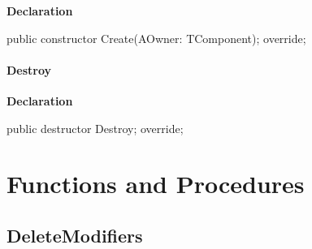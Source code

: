 \documentclass{report}
\newif\ifpdf
\begin{document}
\label{common.TListEntry-Create}
\begin{list}{}{
\setlength{\itemindent}{0cm}
\setlength{\listparindent}{0cm}
\setlength{\leftmargin}{\evensidemargin}
\addtolength{\leftmargin}{\tmplength}
\settowidth{\labelsep}{X}
\addtolength{\leftmargin}{\labelsep}
\setlength{\labelwidth}{\tmplength}
}
\item[\textbf{Declaration}\hfill]
\ifpdf
\begin{flushleft}
\fi
\begin{ttfamily}
public constructor Create(AOwner: TComponent); override;\end{ttfamily}

\ifpdf
\end{flushleft}
\fi

\end{list}
\paragraph*{Destroy}\hspace*{\fill}

\label{common.TListEntry-Destroy}
\begin{list}{}{
\setlength{\itemindent}{0cm}
\setlength{\listparindent}{0cm}
\setlength{\leftmargin}{\evensidemargin}
\addtolength{\leftmargin}{\tmplength}
\settowidth{\labelsep}{X}
\addtolength{\leftmargin}{\labelsep}
\setlength{\labelwidth}{\tmplength}
}
\item[\textbf{Declaration}\hfill]
\ifpdf
\begin{flushleft}
\fi
\begin{ttfamily}
public destructor Destroy; override;\end{ttfamily}

\ifpdf
\end{flushleft}
\fi

\end{list}
\section{Functions and Procedures}
\ifpdf
\subsection*{\large{\textbf{DeleteModifiers}}\normalsize\hspace{1ex}\hrulefill}
\else
\end{document}
